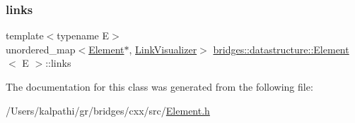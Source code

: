 \subsubsection{\texorpdfstring{links}{links}}
{\footnotesize\ttfamily template$<$typename E$>$ \\
unordered\+\_\+map$<$\mbox{\hyperlink{classbridges_1_1datastructure_1_1_element}{Element}}$\ast$, \mbox{\hyperlink{classbridges_1_1datastructure_1_1_link_visualizer}{Link\+Visualizer}}$>$ \mbox{\hyperlink{classbridges_1_1datastructure_1_1_element}{bridges\+::datastructure\+::\+Element}}$<$ E $>$\+::links\hspace{0.3cm}{\ttfamily [protected]}}



The documentation for this class was generated from the following file\+:\begin{DoxyCompactItemize}
\item 
/\+Users/kalpathi/gr/bridges/cxx/src/\mbox{\hyperlink{_element_8h}{Element.\+h}}\end{DoxyCompactItemize}

